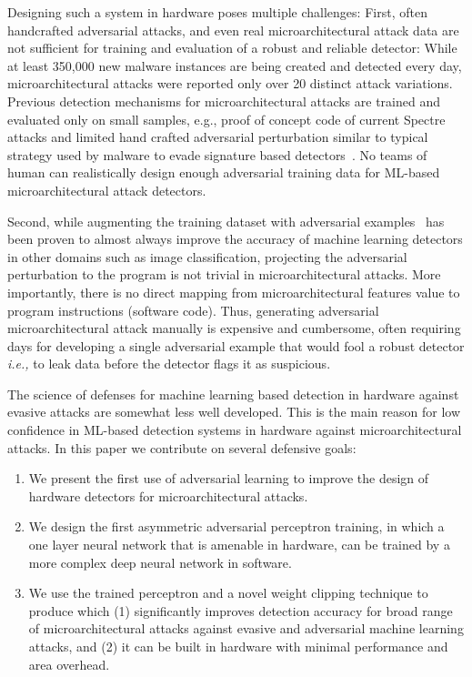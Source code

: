 Designing such a system in hardware poses multiple challenges: First, often handcrafted adversarial attacks, and even real microarchitectural attack data are not sufficient for training and evaluation of a robust and reliable detector: While at least 350,000 new malware instances are being created and detected every day, microarchitectural attacks were reported only over 20 distinct attack variations. 
Previous detection mechanisms for microarchitectural attacks are trained and evaluated only on small samples, e.g., proof of concept code of current Spectre attacks and limited hand crafted adversarial perturbation similar to typical strategy 
used by malware to evade signature based
detectors~\cite{PaulKocher,paulKocherSpectreAttacks}. No teams of human can realistically design enough adversarial training data for ML-based microarchitectural attack detectors.



Second, while augmenting the training dataset with adversarial examples~\cite{szegedy2014going, Goodfellow2015ADVexample, moosavidezfooli2016deepfool} has been proven to almost always improve the accuracy of machine learning detectors in other domains such as image classification, projecting the adversarial perturbation to the program  is not trivial in microarchitectural attacks. More importantly, there is no direct mapping from microarchitectural features value to program instructions (software code).   
 Thus, generating adversarial microarchitectural attack manually is  expensive and cumbersome, often requiring days for developing a single adversarial example that would fool a robust detector {\em i.e.,} to leak data before the detector flags it as suspicious.


The science of defenses for machine learning based  detection in hardware against evasive attacks are somewhat less well developed. This is the main reason for low confidence in ML-based detection systems in hardware against microarchitectural attacks. In this paper we contribute on several defensive goals:

\begin{enumerate}
\item We present the first use of adversarial learning to improve the
design of hardware detectors for microarchitectural attacks. 
\vspace{2mm}

\item We design the first asymmetric  adversarial perceptron training, in which a one layer neural network that is amenable in hardware, can be trained by a more complex deep neural network in software.
\vspace{2mm}

\item We use the trained perceptron and a novel weight clipping technique to produce \scheme{} which (1) significantly improves detection accuracy for broad range of microarchitectural attacks against evasive and adversarial machine learning attacks, and (2) it can be built in hardware with minimal performance and area overhead. 
\end{enumerate}
